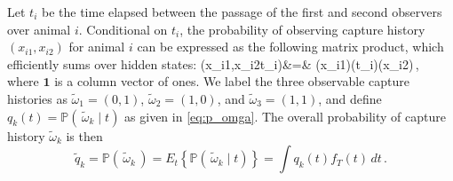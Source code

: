 \documentclass[useAMS, usenatbib, referee]{biom}\usepackage[]{graphicx}\usepackage[]{color}
\newcommand{\dotomega}{\tilde{\omega}}
\begin{document}
Let $t_i$ be the time elapsed between the passage of the first and second observers over animal $i$.
Conditional on $t_{i}$, the probability of observing capture history $(x_{i1},x_{i2})$ for animal $i$ can be expressed as the following matrix product, which efficiently sums over hidden states:
\be
{}(x_{i1},x_{i2}\mid t_{i})&=&
\bm{\delta}(x_{i1})\bm{\Gamma}(t_{i})(x_{i2})\,,
\label{eq:p_omga}
\ee
\noindent
where $\bm{1}$ is a column vector of ones. We label the three observable capture histories as $\dotomega_1=(0, 1)$, $\dotomega_2=(1,0)$, and $\dotomega_3=(1,1)$, and define $q_k(t) = \mathbb{P}(\,\dotomega_k \mid t)$ as given in \eqref{eq:p_omga}. The overall probability of capture history $\dotomega_k$ is then
\begin{equation}
\tilde{q}_k=\mathbb{P}(\,\dotomega_k\,)=E_{t}\left\{ \mathbb{P}(\,\dotomega_k \mid t) \right\}=\displaystyle\int q_{k}(t)f_{T}(t)\,dt\,.
\label{eq:ptilde}
\end{equation}
\noindent



\end{document}
